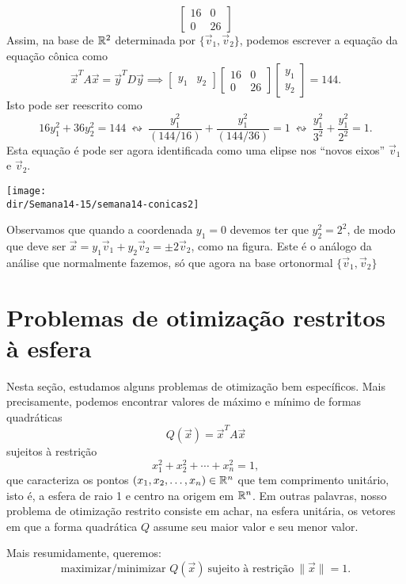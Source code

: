 \documentclass[../livro.tex]{subfiles}
\providecommand{\dir}{..}  %
\begin{document}
\begin{example}
\[\begin{bmatrix}
	16 & 0 \\ 0 & 26
	\end{bmatrix}
	\] Assim, na base de $\mathbb{R}^2$ determinada por $\{\vec{v}_1, \vec{v}_2\}$, podemos escrever a equação da equação cônica como
	\[
	\vec{x}^T A \vec{x} = \vec{y}^T D \vec{y} \implies 
	\begin{bmatrix}
	y_1 & y_2
	\end{bmatrix}
	\begin{bmatrix}
	16 & 0 \\ 0 & 26
	\end{bmatrix}
	\begin{bmatrix}
	y_1 \\ y_2
	\end{bmatrix} = 144.
	\] Isto pode ser reescrito como
	\[
	16 y_1^2 + 36 y_2^2 = 144 \ \leftrightsquigarrow \ \frac{y_1^2}{(144/16)} + \frac{y_1^2}{(144/36)} = 1 \ \leftrightsquigarrow \ \frac{y_1^2}{3^2} + \frac{y_1^2}{2^2} = 1.
	\] Esta equação é pode ser agora identificada como uma elipse nos ``novos eixos'' $\vec{v}_1$ e $\vec{v}_2$.
	\begin{center}
		\texttt{[image: \\dir/Semana14-15/semana14-conicas2]}
	\end{center}
	
	\noindent Observamos que quando a coordenada $y_1 = 0$ devemos ter que $y_2^2 = 2^2$, de modo que deve ser $\vec{x} = y_1 \vec{v}_1 + y_2 \vec{v}_2 = \pm 2 \vec{v}_2$, como na figura. Este é o análogo da análise que normalmente fazemos, só que agora na base ortonormal $\{\vec{v}_1, \vec{v}_2\}$
\end{example}


\section{Problemas de otimização restritos à esfera}

Nesta seção, estudamos alguns problemas de otimização bem específicos. Mais precisamente, podemos encontrar valores de máximo e mínimo de formas quadráticas
\[
Q(\vec{x}) = \vec{x}^T A \vec{x}
\] sujeitos à restrição 
\[
x_1^2 + x_2^2 + \cdots + x_n^2 = 1,
\] que caracteriza os pontos $(x_1, x_2, \dots, x_n) \in \mathbb{R}^n$ que tem comprimento unitário, isto é, a esfera de raio 1 e centro na origem em $\mathbb{R}^n$. Em outras palavras, nosso problema de otimização restrito consiste em achar, na esfera unitária, os vetores em que a forma quadrática $Q$ assume seu maior valor e seu menor valor.

Mais resumidamente, queremos:
\[
\text{maximizar/minimizar } Q(\vec{x}) \ \text{sujeito à restrição} \ \|\vec{x}\|=1.
\]
\end{document}
